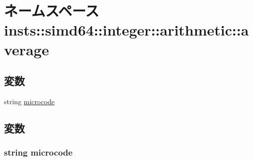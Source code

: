 \hypertarget{namespaceinsts_1_1simd64_1_1integer_1_1arithmetic_1_1average}{
\section{ネームスペース insts::simd64::integer::arithmetic::average}
\label{namespaceinsts_1_1simd64_1_1integer_1_1arithmetic_1_1average}
}
\subsection*{変数}
\begin{DoxyCompactItemize}
\item 
string \hyperlink{namespaceinsts_1_1simd64_1_1integer_1_1arithmetic_1_1average_a770f11a173e99389a8802f0107ed8f52}{microcode}
\end{DoxyCompactItemize}


\subsection{変数}
\hypertarget{namespaceinsts_1_1simd64_1_1integer_1_1arithmetic_1_1average_a770f11a173e99389a8802f0107ed8f52}{
\subsubsection[{microcode}]{\setlength{\rightskip}{0pt plus 5cm}string {\bf microcode}}}
\label{namespaceinsts_1_1simd64_1_1integer_1_1arithmetic_1_1average_a770f11a173e99389a8802f0107ed8f52}
